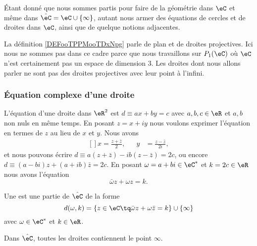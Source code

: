 Étant donné que nous sommes partis pour faire de la géométrie dans \( \eC\) et même dans \( \hat \eC=\eC\cup \{ \infty \}\), autant nous armer des équations de cercles et de droites dans \( \eC\), ainsi que de quelque notions adjacentes.

\begin{remark}
    La définition \ref{DEFooTPPMooTDxNpg} parle de plan et de droites projectives. Ici nous ne sommes pas dans ce cadre parce que nous travaillons sur \( P_1(\eC)\) où \( \eC\) n'est certainement pas un espace de dimension \( 3\). Les droites dont nous allons parler ne sont pas des droites projectives avec leur point à l'infini.
\end{remark}

\subsubsection{Équation complexe d'une droite}

L'équation d'une droite dans \( \eR^2\) est \( d\equiv ax+by=c\) avec \( a,b,c\in \eR\) et \( a,b\) non nuls en même temps. En posant \( z=x+iy\) nous voulons exprimer l'équation en termes de \( z\) au lieu de \( x\) et \( y\). Nous avons\cite{ooWNHWooGUnivi}
\begin{equation}
    \begin{aligned}[]
        x=\frac{ z+\bar z }{2},&&y&=\frac{ z-\bar z }{ 2i },
    \end{aligned}
\end{equation}
et nous pouvons écrire \( d\equiv a(z+\bar z)-ib(z-\bar z)=2c\), ou encore \( d\equiv (a-bi)z+(a+ib)\bar z=2c\). En posant \( \omega=a+bi\in \eC^*\) et \( k=2c\in \eR\) nous avons l'équation
\begin{equation}        \label{EQooPRCPooVvrHME}
    \bar \omega z+\omega z=k.
\end{equation}

\begin{definition}      \label{DEFooAQSMooWNOzAI}
    Une  est une partie de \( \hat\eC\) de la forme
    \begin{equation}
        d(\omega,k)=\{ z\in \eC\tq \bar\omega z+\omega\bar z=k \}\cup\{ \infty \}
    \end{equation}
    avec \( \omega\in \eC^*\) et \( k\in \eR\).
\end{definition}
Dans \( \hat \eC\), toutes les droites contiennent le point \( \infty\).


